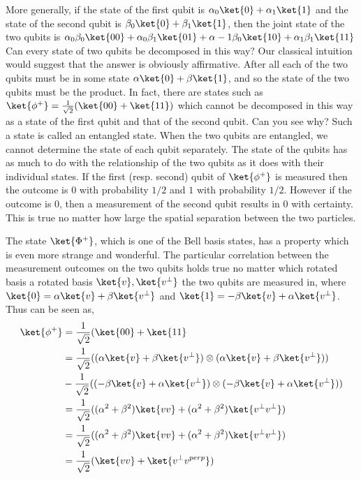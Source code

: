 \documentclass[12pt, oneside]{book}
\theoremstyle{definition}
\theoremstyle{definition}
\theoremstyle{remark}
\begin{document}
More generally, if the state of the first qubit is $\alpha_0\ket{0}+\alpha_1\ket{1}$ and the state of the second qubit is $\beta_0\ket{0}+\beta_1\ket{1}$, then the joint state of the two qubits is $\alpha_{0}\beta_0\ket{00}+\alpha_0\beta_1\ket{01}+\alpha-1\beta_0\ket{10}+\alpha_1\beta_1\ket{11}$ Can every state of two qubits be decomposed in this way? Our classical intuition would suggest that the answer is obviously affirmative. After all each of the two qubits must be in some state $\alpha\ket{0}+\beta\ket{1}$, and so the state of the two qubits must be the product. In fact, there are states such as $\ket{\phi^{+}}=\frac{1}{\sqrt{2}}(\ket{00}+\ket{11})$ which cannot be decomposed in this way as a state of the first qubit and that of the second qubit. Can you see why? Such a state is called an entangled state. When the two qubits are entangled, we cannot determine the state of each qubit separately. The state of the qubits has as much to do with the relationship of the two qubits as it does with their individual states. If the first (resp. second) qubit of $\ket{\phi^{+}}$ is measured then the outcome is $0$ with probability $1/2$ and $1$ with probability $1/2$. However if the outcome is $0$, then a measurement of the second qubit results in $0$ with certainty. This is true no matter how large the spatial separation between the two particles. 

The state $\ket{\Phi^{+}}$, which is one of the Bell basis states, has a property which is even more strange and wonderful. The particular correlation between the measurement outcomes on the two qubits holds true no matter which rotated basis a rotated basis $\ket{v}, \ket{v^{\perp}}$ the two qubits are measured in, where $\ket{0}=\alpha\ket{v}+\beta\ket{v^{\perp}}$ and $\ket{1}=-\beta\ket{v}+\alpha\ket{v^{\perp}}$. Thus can be seen as,
\begin{align*}
    \ket{\phi^{+}}&=\frac{1}{\sqrt{2}}(\ket{00}+\ket{11}\\
    &=\frac{1}{\sqrt{2}} ((\alpha\ket{v}+\beta\ket{v^{\perp}}) \otimes (\alpha\ket{v}+\beta\ket{v^{\perp}}))\\
    &-\frac{1}{\sqrt{2}}((-\beta\ket{v}+\alpha\ket{v^{\perp}})\otimes (-\beta\ket{v}+\alpha\ket{v^{\perp}}))\\
    &=\frac{1}{\sqrt{2}}((\alpha^2+\beta^2)\ket{vv}+(\alpha^2+\beta^2)\ket{v^{\perp}v^{\perp}})\\
    &=\frac{1}{\sqrt{2}}((\alpha^2+\beta^2)\ket{vv}+(\alpha^2+\beta^2)\ket{v^{\perp}v^{\perp}})\\
    &=\frac{1}{\sqrt{2}}(\ket{vv}+\ket{v^{\perp}v^{perp}})
\end{align*}
\end{document}
